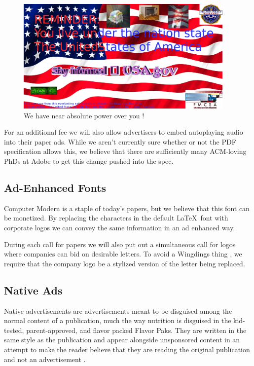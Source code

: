 \begin{figure}
\centering
\includegraphics[width=0.95\textwidth]{figures/usa-ad.png}
\caption{We have near absolute power over you \cite{eagle, kanye, microwave}!}
\label{fig:usa}
\end{figure}

For an additional fee we will also allow advertisers to embed autoplaying audio
into their paper ads.
While we aren't currently sure whether or not the PDF specification allows
this, we believe that there are sufficiently many ACM-loving PhDs at Adobe to
get this change  pushed into the spec.

\subsection{Ad-Enhanced Fonts}
Computer Modern is a staple of today's papers, but we believe that this font can
be monetized.
By replacing the characters in the default \LaTeX\ font with corporate logos
we can convey the same information in an ad enhanced way.



During each call for papers we will also put out a simultaneous call for
logos where companies can bid on desirable letters.
To avoid a Wingdings thing \cite{wingdings}, we require that the company
logo be a stylized version of the letter being replaced.


\subsection{Native Ads}
Native advertisements are advertisements meant to be disguised among the normal
content of a publication, much the way nutrition is disguised in the
kid-tested, parent-approved, and flavor packed Flavor Paks.
They are written in the same style as the publication and appear alongside
unsponsored content in an attempt to make the reader believe that they are
reading the original publication and not an advertisement \cite{native}.

